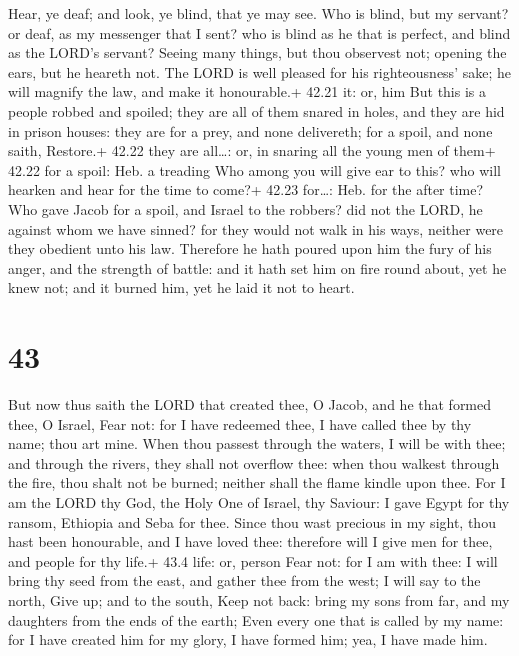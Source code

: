  Hear, ye deaf; and look, ye blind, that ye may see.
 Who is blind, but my servant? or deaf, as my messenger
that I sent? who is blind as he that is perfect, and blind as the LORD's
servant?  Seeing many things, but thou observest not;
opening the ears, but he heareth not.  The LORD is well
pleased for his righteousness' sake; he will magnify the law, and make
it honourable.+ 42.21 it: or, him  But this is a people
robbed and spoiled; they are all of them snared in holes, and they are
hid in prison houses: they are for a prey, and none delivereth; for a
spoil, and none saith, Restore.+ 42.22 they are all\ldots: or, in
snaring all the young men of them+ 42.22 for a spoil: Heb. a treading
 Who among you will give ear to this? who will hearken and
hear for the time to come?+ 42.23 for\ldots: Heb. for the after time?
 Who gave Jacob for a spoil, and Israel to the robbers? did
not the LORD, he against whom we have sinned? for they would not walk in
his ways, neither were they obedient unto his law. 
Therefore he hath poured upon him the fury of his anger, and the
strength of battle: and it hath set him on fire round about, yet he knew
not; and it burned him, yet he laid it not to heart.

\hypertarget{section-42}{%
\section{43}\label{section-42}}

 But now thus saith the LORD that created thee, O Jacob, and
he that formed thee, O Israel, Fear not: for I have redeemed thee, I
have called thee by thy name; thou art mine.  When thou
passest through the waters, I will be with thee; and through the rivers,
they shall not overflow thee: when thou walkest through the fire, thou
shalt not be burned; neither shall the flame kindle upon thee.
 For I am the LORD thy God, the Holy One of Israel, thy
Saviour: I gave Egypt for thy ransom, Ethiopia and Seba for thee.
 Since thou wast precious in my sight, thou hast been
honourable, and I have loved thee: therefore will I give men for thee,
and people for thy life.+ 43.4 life: or, person  Fear not:
for I am with thee: I will bring thy seed from the east, and gather thee
from the west;  I will say to the north, Give up; and to the
south, Keep not back: bring my sons from far, and my daughters from the
ends of the earth;  Even every one that is called by my
name: for I have created him for my glory, I have formed him; yea, I
have made him.

